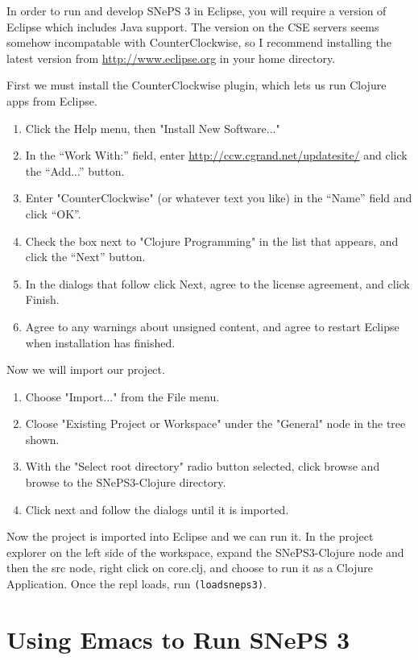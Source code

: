 \documentclass[letterpaper,colorlinks=true,linkcolor=blue]{book}
\begin{document}
In order to run and develop SNePS 3 in Eclipse, you will require a version of Eclipse which includes Java support. The version on the CSE servers seems somehow incompatable with CounterClockwise, so I recommend installing the latest version from \url{http://www.eclipse.org} in your home directory.

First we must install the CounterClockwise plugin, which lets us run Clojure apps from Eclipse.

\begin{enumerate}
  \item Click the Help menu, then "Install New Software..."
  \item In the ``Work With:'' field, enter \url{http://ccw.cgrand.net/updatesite/} and click the ``Add...'' button.
  \item Enter "CounterClockwise" (or whatever text you like) in the ``Name'' field and click ``OK''.
  \item Check the box next to "Clojure Programming" in the list that appears, and click the ``Next'' button.
  \item In the dialogs that follow click Next, agree to the license agreement, and click Finish.
  \item Agree to any warnings about unsigned content, and agree to restart Eclipse when installation has finished.
\end{enumerate}

Now we will import our project. 

\begin{enumerate}
  \item Choose "Import..." from the File menu.
  \item Cloose "Existing Project or Workspace" under the "General" node in the tree shown.
  \item With the "Select root directory" radio button selected, click browse and browse to the SNePS3-Clojure directory.
  \item Click next and follow the dialogs until it is imported.
\end{enumerate}

Now the project is imported into Eclipse and we can run it. In the project explorer on the left side of the workspace, expand the SNePS3-Clojure node and then the src node, right click on core.clj, and choose to run it as a Clojure Application. Once the repl loads, run \texttt{(loadsneps3)}.

\section{Using Emacs to Run SNePS 3}
\end{document}
